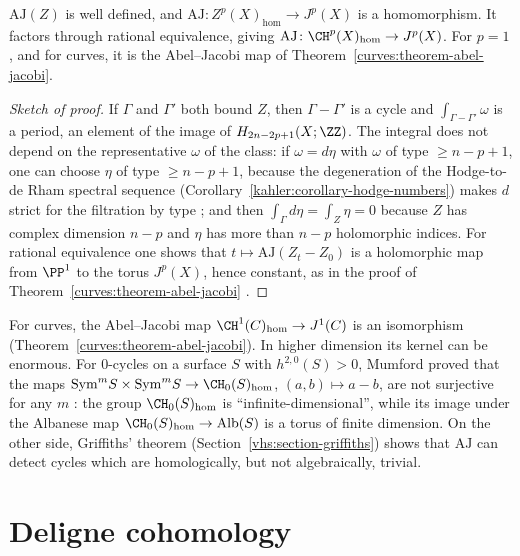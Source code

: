 \begin{proposition}\label{vhs:proposition-abel-jacobi}
$\mathrm{AJ}(Z)$ is well defined, and $\mathrm{AJ} \colon Z^p(X)_{\mathrm{hom}} \to J^p(X)$ is a homomorphism. It factors through rational equivalence, giving
$\mathrm{AJ} \colon \CH^p(X)_{\mathrm{hom}} \to J^p(X)$. For $p = 1$, and for curves, it is the Abel--Jacobi map of Theorem~\ref{curves:theorem-abel-jacobi}.
\end{proposition}

\begin{proof}[Sketch of proof]
If $\Gamma$ and $\Gamma'$ both bound $Z$, then $\Gamma - \Gamma'$ is a cycle and $\int_{\Gamma-\Gamma'}\omega$ is a period, an element of the image of $H_{2n-2p+1}(X; \ZZ)$. The integral does not depend on the
representative $\omega$ of the class: if $\omega = d\eta$ with $\omega$ of type $\geq n - p + 1$, one can choose $\eta$ of type $\geq n - p + 1$, because the degeneration of the
Hodge-to-de Rham spectral sequence (Corollary~\ref{kahler:corollary-hodge-numbers}) makes $d$ strict for the filtration by type \cite[Chapter 8]{voisin-hodge-1}; and then $\int_\Gamma d\eta = \int_Z\eta = 0$ because $Z$ has complex dimension $n - p$ and $\eta$ has more than $n - p$ holomorphic indices. For
rational equivalence one shows that $t \mapsto \mathrm{AJ}(Z_t - Z_0)$ is a holomorphic map from $\PP^1$ to the torus $J^p(X)$, hence constant, as in the proof of
Theorem~\ref{curves:theorem-abel-jacobi} \cite[Chapter 12]{voisin-hodge-1}.
\end{proof}

\begin{remark}\label{vhs:remark-kernel-abel-jacobi}
For curves, the Abel--Jacobi map $\CH^1(C)_{\mathrm{hom}} \to J^1(C)$ is an isomorphism (Theorem~\ref{curves:theorem-abel-jacobi}). In higher dimension its kernel can be enormous. For $0$-cycles on a
surface $S$ with $h^{2,0}(S) > 0$, Mumford proved that the maps $\mathrm{Sym}^mS \times \mathrm{Sym}^mS \to \CH_0(S)_{\mathrm{hom}}$, $(a, b) \mapsto a - b$, are not surjective for any $m$
\cite{mumford-1968}: the group $\CH_0(S)_{\mathrm{hom}}$ is ``infinite-dimensional'', while its image under the Albanese map $\CH_0(S)_{\mathrm{hom}} \to \mathrm{Alb}(S)$ is a torus of finite dimension. On the other side, Griffiths' theorem (Section~\ref{vhs:section-griffiths}) shows that $\mathrm{AJ}$ can detect cycles which are homologically, but not algebraically,
trivial.
\end{remark}

\section{Deligne cohomology}\label{vhs:section-deligne-cohomology}

